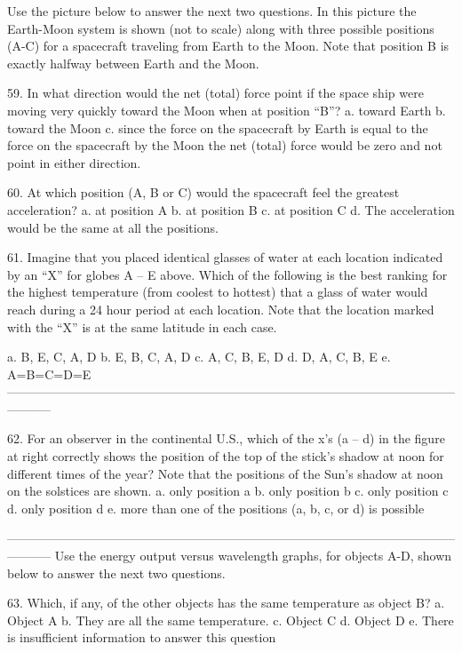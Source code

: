 Use the picture below to answer the next two questions.  In this picture the Earth-Moon system is shown (not to scale) along with three possible positions (A-C) for a spacecraft traveling from Earth to the Moon.  Note that position B is exactly halfway between Earth and the Moon. 

59. In what direction would the net (total) force point if the space ship were moving very quickly toward the Moon when at position “B”?
a. toward Earth
b. toward the Moon
c. since the force on the spacecraft by Earth is equal to the force on the spacecraft by the Moon the net (total) force would be zero and not point in either direction.

60. At which position (A, B or C) would the spacecraft feel the greatest acceleration?
a. at position A
b. at position B
c. at position C
d. The acceleration would be the same at all the positions.


61. Imagine that you placed identical glasses of water at each location indicated by an “X” for globes A – E above.  Which of the following is the best ranking for the highest temperature (from coolest to hottest) that a glass of water would reach during a 24 hour period at each location.  Note that the location marked with the “X” is at the same latitude in each case. 

a. B, E, C, A, D
b. E, B, C, A, D
c. A, C, B, E, D 
d. D, A, C, B, E
e. A=B=C=D=E
-----------------------------------------------------------------------------------------------------------------------


62. For an observer in the continental U.S., which of the x’s (a – d) in the figure at right correctly shows the position of the top of the stick’s shadow at noon for different times of the year? Note that the positions of the Sun’s shadow at noon on the solstices are shown. 
a. only position a
b. only position b
c. only position c
d. only position d
e. more than one of the positions (a, b, c, or d) is possible








-----------------------------------------------------------------------------------------------------------------------
Use the energy output versus wavelength graphs, for objects A-D, shown below to answer the next two questions.

63. Which, if any, of the other objects has the same temperature as object B?  
a. Object A
b. They are all the same temperature.
c. Object C
d. Object D
e. There is insufficient information to answer this question

